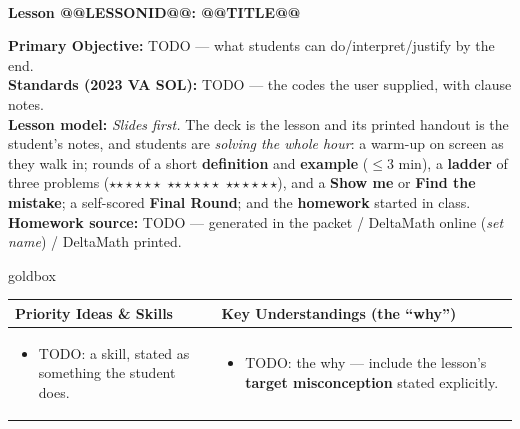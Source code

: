 \documentclass[10pt]{article}
\makeatletter
\newcommand{\LessonNumberName}{Lesson @@LESSONID@@: @@TITLE@@}
\newcommand{\rung}[1]{{\color{goldacc}\ifcase#1\or$\star$\or$\star\star$\or$\star\star\star$\fi}}
\makeatother
\begin{document}
\begin{center}
    {\Large\bfseries \CourseName \\
    {\small\bfseries \UnitNumberName \LessonNumberName}}
\end{center}

\begin{tcolorbox}[colback=forestbg, colframe=forest, boxrule=0.9pt, arc=2mm,
    left=2mm, right=2mm, top=1.5mm, bottom=1.5mm]
    \textbf{Primary Objective:} TODO --- what students can do/interpret/justify by the end.
    \\[2pt]
    \textbf{Standards (2023 VA SOL):} TODO --- the codes the user supplied, with clause notes.
    \\[2pt]
    \textbf{Lesson model:} \emph{Slides first.} The deck is the lesson and its printed handout is
    the student's notes, and students are \emph{solving the whole hour}: a warm-up on screen as
    they walk in; rounds of a short \textbf{definition} and \textbf{example} ($\le$3 min), a
    \textbf{ladder} of three problems (\rung1\ \rung2\ \rung3), and a \textbf{Show me} or
    \textbf{Find the mistake}; a self-scored \textbf{Final Round}; and the \textbf{homework}
    started in class. \textbf{Homework source:} TODO --- generated in the packet / DeltaMath
    online (\emph{set name}) / DeltaMath printed.
\end{tcolorbox}

\renewcommand{\arraystretch}{1.4}
\begin{skillbox}{goldbox}
\begin{tabularx}{\linewidth}{@{}X|X@{}}
\textbf{Priority Ideas \& Skills} & \textbf{Key Understandings (the ``why'')} \\[2pt]
\hline
\vspace{-6pt}
\begin{itemize}[leftmargin=1.1em, nosep, after=\vspace{2pt}]
  \item TODO: a skill, stated as something the student does.
\end{itemize}
&
\vspace{-6pt}
\begin{itemize}[leftmargin=1.1em, nosep, after=\vspace{2pt}]
  \item TODO: the why --- include the lesson's \textbf{target misconception} stated explicitly.
\end{itemize}
\end{tabularx}
\end{skillbox}
\end{document}
